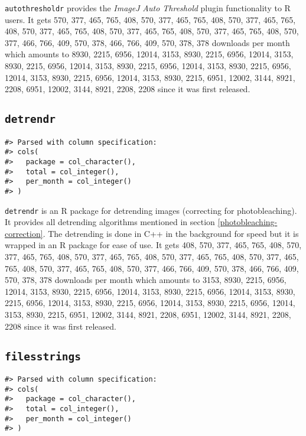 \documentclass[12pt,]{book}
\theoremstyle{definition}
\theoremstyle{definition}
\theoremstyle{definition}
\theoremstyle{remark}
\begin{document}
\texttt{autothresholdr} provides the \emph{ImageJ} \citep{ImageJ}
\emph{Auto Threshold} plugin \citep{autothresholdr} functionality to R
users. It gets 570, 377, 465, 765, 408, 570, 377, 465, 765, 408, 570,
377, 465, 765, 408, 570, 377, 465, 765, 408, 570, 377, 465, 765, 408,
570, 377, 465, 765, 408, 570, 377, 466, 766, 409, 570, 378, 466, 766,
409, 570, 378, 378 downloads per month which amounts to 8930, 2215,
6956, 12014, 3153, 8930, 2215, 6956, 12014, 3153, 8930, 2215, 6956,
12014, 3153, 8930, 2215, 6956, 12014, 3153, 8930, 2215, 6956, 12014,
3153, 8930, 2215, 6956, 12014, 3153, 8930, 2215, 6951, 12002, 3144,
8921, 2208, 6951, 12002, 3144, 8921, 2208, 2208 since it was first
released.

\subsection{\texorpdfstring{\texttt{detrendr}}{detrendr}}\label{detrendr}

\begin{verbatim}
#> Parsed with column specification:
#> cols(
#>   package = col_character(),
#>   total = col_integer(),
#>   per_month = col_integer()
#> )
\end{verbatim}

\texttt{detrendr} is an R package for detrending images (correcting for
photobleaching). It provides all detrending algorithms mentioned in
section \ref{photobleaching-correction}. The detrending is done in C++
in the background for speed but it is wrapped in an R package for ease
of use. It gets 408, 570, 377, 465, 765, 408, 570, 377, 465, 765, 408,
570, 377, 465, 765, 408, 570, 377, 465, 765, 408, 570, 377, 465, 765,
408, 570, 377, 465, 765, 408, 570, 377, 466, 766, 409, 570, 378, 466,
766, 409, 570, 378, 378 downloads per month which amounts to 3153, 8930,
2215, 6956, 12014, 3153, 8930, 2215, 6956, 12014, 3153, 8930, 2215,
6956, 12014, 3153, 8930, 2215, 6956, 12014, 3153, 8930, 2215, 6956,
12014, 3153, 8930, 2215, 6956, 12014, 3153, 8930, 2215, 6951, 12002,
3144, 8921, 2208, 6951, 12002, 3144, 8921, 2208, 2208 since it was first
released.

\subsection{\texorpdfstring{\texttt{filesstrings}}{filesstrings}}\label{filesstrings}

\begin{verbatim}
#> Parsed with column specification:
#> cols(
#>   package = col_character(),
#>   total = col_integer(),
#>   per_month = col_integer()
#> )
\end{verbatim}
\end{document}
